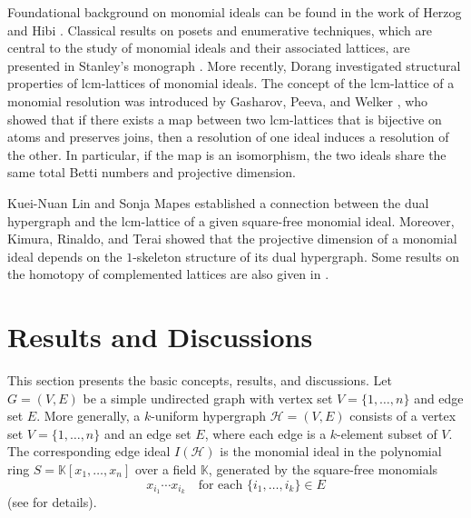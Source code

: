\documentclass[11pt]{amsart}
\newcommand{\lcm}{\mathrm{lcm}}
\theoremstyle{plain}
\numberwithin{lemma}{\DefaultNumberTheoremWithin}
\numberwithin{claim}{\DefaultNumberTheoremWithin}
\numberwithin{theorem}{\DefaultNumberTheoremWithin}
\numberwithin{corollary}{\DefaultNumberTheoremWithin}
\numberwithin{proposition}{\DefaultNumberTheoremWithin}
\numberwithin{conjecture}{\DefaultNumberTheoremWithin}
\theoremstyle{definition}
\numberwithin{definition}{\DefaultNumberTheoremWithin}
\theoremstyle{definition}
\numberwithin{question}{\DefaultNumberTheoremWithin}
\theoremstyle{definition}
\numberwithin{problem}{\DefaultNumberTheoremWithin}
\theoremstyle{remark}
\numberwithin{remark}
     {\DefaultNumberTheoremWithin}
\theoremstyle{remark}
\numberwithin{example}{\DefaultNumberTheoremWithin}
\begin{document}
Foundational background on monomial ideals can be found in the work of Herzog and Hibi \cite{HerzogHibi2011}. Classical results on posets and enumerative techniques, which are central to the study of monomial ideals and their associated lattices, are presented in Stanley’s monograph \cite{StanleyRP2011}. More recently, Dorang \cite{DorangMc2025, DorangMT2025} investigated structural properties of $\lcm$-lattices of monomial ideals. The concept of the $\lcm$-lattice of a monomial resolution was introduced by Gasharov, Peeva, and Welker \cite{WelkerPV1999}, who showed that if there exists a map between two $\lcm$-lattices that is bijective on atoms and preserves joins, then a resolution of one ideal induces a resolution of the other. In particular, if the map is an isomorphism, the two ideals share the same total Betti numbers and projective dimension. 

Kuei-Nuan Lin and Sonja Mapes \cite{KUEISONJA2022} established a connection between the dual hypergraph and the $\lcm$-lattice of a given square-free monomial ideal. Moreover, Kimura, Rinaldo, and Terai \cite{KIMURATERAI} showed that the projective dimension of a monomial ideal depends on the $1$-skeleton structure of its dual hypergraph. Some results on the homotopy of complemented lattices are also given in \cite{sara}.
  \section{Results and Discussions}
   This section presents the basic concepts, results, and discussions. Let $G = (V,E)$ be a simple undirected graph with vertex set $V = \{1, \dots, n\}$ and edge set $E$. More generally, a $k$-uniform hypergraph $\mathcal{H} = (V,E)$ consists of a vertex set $V = \{1, \dots, n\}$ and an edge set $E$, where each edge is a $k$-element subset of $V$. The corresponding edge ideal $I(\mathcal{H})$ is the monomial ideal in the polynomial ring $S = \mathbb{K}[x_1, \dots, x_n]$ over a field $\mathbb{K}$, generated by the square-free monomials 
\[
x_{i_1} \cdots x_{i_k} \quad \text{for each } \{i_1, \dots, i_k\} \in E
\]
(see \cite{LinMcCullough2013, GhoshPaulos2024} for details).
 

    
\end{document}
